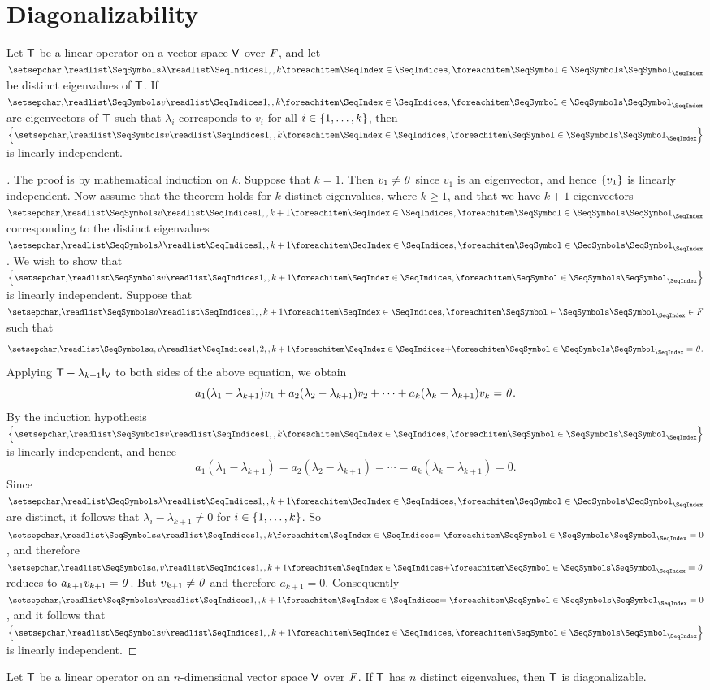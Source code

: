 \section{Diagonalizability}\label{sec:5.2}

\begin{thm}\label{5.5}
	Let \(\mathsf{T}\) be a linear operator on a vector space \(\mathsf{V}\) over \(\mathit{F}\), and let \(\seq{\lambda}{1,,k}\) be distinct eigenvalues of \(\mathsf{T}\).
	If \(\seq{v}{1,,k}\) are eigenvectors of \(\mathsf{T}\) such that \(\lambda_i\) corresponds to \(v_i\) for all \(i \in \left\lbrace1, \dots, k\right\rbrace\), then \(\set{\seq{v}{1,,k}}\) is linearly independent.
\end{thm}

\begin{proof}[]
	The proof is by mathematical induction on \(k\).
	Suppose that \(k = 1\).
	Then \(v_1 \neq \mathit{0}\) since \(v_1\) is an eigenvector, and hence \(\left\lbrace v_1\right\rbrace\) is linearly independent.
	Now assume that the theorem holds for \(k\) distinct eigenvalues, where \(k \geq 1\), and that we have \(k + 1\) eigenvectors \(\seq{v}{1,,k+1}\) corresponding to the distinct eigenvalues \(\seq{\lambda}{1,,k+1}\).
	We wish to show that \(\set{\seq{v}{1,,k+1}}\) is linearly independent.
	Suppose that \(\seq{a}{1,,k+1} \in \F\) such that
	\[
		\seq[+]{a,v}{1,2,,k+1} = \zv.
	\]
	Applying \(\T - \lambda_{k + 1} \IT[\V]\) to both sides of the above equation, we obtain
	\[
		a_1 (\lambda_1 - \lambda_{k + 1}) v_1 + a_2 (\lambda_2 - \lambda_{k + 1}) v_2 + \cdots + a_k (\lambda_k - \lambda_{k + 1}) v_k = \mathit{0}.
	\]
	By the induction hypothesis \(\set{\seq{v}{1,,k}}\) is linearly independent, and
	hence
	\[
		a_1 (\lambda_1 - \lambda_{k + 1}) = a_2 (\lambda_2 - \lambda_{k + 1}) = \cdots = a_k (\lambda_k - \lambda_{k + 1}) = 0.
	\]
	Since \(\seq{\lambda}{1,,k+1}\) are distinct, it follows that \(\lambda_i - \lambda_{k + 1} \neq 0\) for \(i \in \left\lbrace1, \dots, k\right\rbrace\).
	So \(\seq[=]{a}{1,,k} = 0\), and therefore \(\seq[+]{a,v}{1,,k+1} = \zv\) reduces to \(a_{k + 1} v_{k + 1} = \mathit{0}\).
	But \(v_{k + 1} \neq \mathit{0}\) and therefore \(a_{k + 1} = 0\).
	Consequently \(\seq[=]{a}{1,,k+1} = 0\), and it follows that \(\set{\seq{v}{1,,k+1}}\) is linearly independent.
\end{proof}

\begin{cor}\label{5.2.1}
	Let \(\mathsf{T}\) be a linear operator on an \(n\)-dimensional vector space \(\mathsf{V}\) over \(\mathit{F}\).
	If \(\mathsf{T}\) has \(n\) distinct eigenvalues, then \(\mathsf{T}\) is diagonalizable.
\end{cor}

